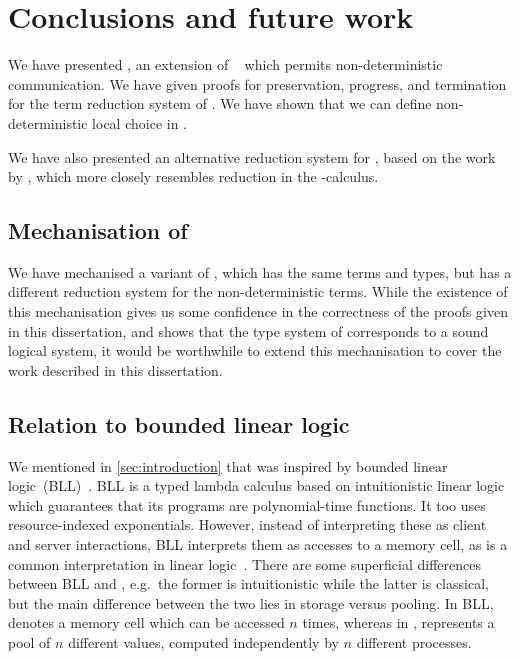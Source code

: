 \chapter{Conclusions and future work}\label{sec:discussion}
We have presented \nodcap, an extension of \cp~\parencite{wadler2012} which permits
non-deterministic communication. 
We have given proofs for preservation, progress, and termination for the term
reduction system of \nodcap.
We have shown that we can define non-deterministic local choice in \nodcap.

We have also presented an alternative reduction system for \cp, based on the
work by \textcite{lindley2015semantics}, which more closely resembles reduction
in the \textpi-calculus.

\section{Mechanisation of \nodcap}
We have mechanised a variant of \nodcap, which has the same terms and types, but
has a different reduction system for the non-deterministic terms.
While the existence of this mechanisation gives us some confidence in the
correctness of the proofs given in this dissertation, and shows that the type
system of \nodcap corresponds to a sound logical system, it would be worthwhile
to extend this mechanisation to cover the work described in this dissertation.

\section{Relation to bounded linear logic}
We mentioned in \cref{sec:introduction} that \nodcap was inspired by
bounded linear logic~(BLL)~\parencite{girard1992}. BLL is a typed lambda calculus
based on intuitionistic linear logic which guarantees that its programs are
polynomial-time functions.
It too uses resource-indexed exponentials. However, instead of interpreting
these as client and server interactions, BLL interprets them as accesses to a
memory cell, as is a common interpretation in linear logic~\parencite{girard1987}.
There are some superficial differences between BLL and \nodcap, e.g.\ the former
is intuitionistic while the latter is classical, but the main difference between
the two lies in storage versus pooling. In BLL,  denotes a memory
cell which can be accessed $n$ times, whereas in \nodcap, 
represents a pool of $n$ different values, computed independently by $n$
different processes.

